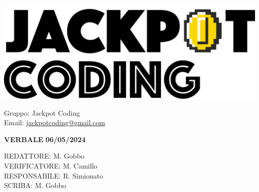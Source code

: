 \documentclass[5pt]{article}
\begin{document}
\begin{minipage}[t]{0.50\textwidth}
    \begin{flushleft}
        \hspace{10pt}
        \includegraphics[scale=0.65]{jackpot-logo.png} 
    \end{flushleft}
\end{minipage}
\hspace{-60pt} %
\begin{flushright}
    \begin{minipage}[t]{0.50\textwidth}
        \begin{flushright}
            Gruppo: {\Large Jackpot Coding}\\
            Email: \href{mailto:jackpotcoding@gmail.com}{jackpotcoding@gmail.com}
        \end{flushright}
    \end{minipage}
\end{flushright}

\vspace{20pt}

\begin{center}
    \textbf{\large VERBALE }
    \textbf{\large 06/05/2024} \\
\end{center}

\vspace{13pt}

\begin{flushleft}
    \begin{spacing}{1.5}
        REDATTORE: M. Gobbo\\ 
        VERIFICATORE: M. Camillo\\ 
        RESPONSABILE: R. Simionato\\ 
        \vspace{7pt}
        SCRIBA: M. Gobbo\\ 
    \end{spacing}
\end{flushleft}
\end{document}
